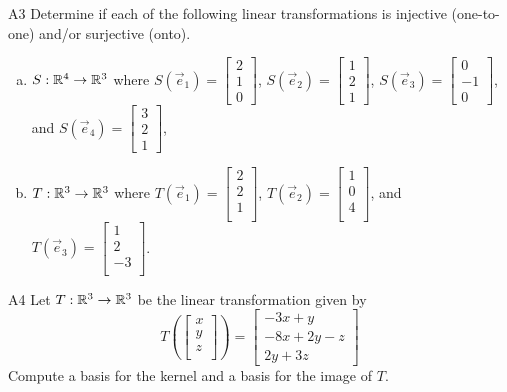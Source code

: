 \documentclass{sbgLAsemi}
\begin{document}
\begin{problem}{A3}
Determine if each of the following linear transformations is injective (one-to-one) and/or surjective (onto).
\begin{enumerate}[(a)]
\item
  \(S: \mathbb{R}^4 \rightarrow \mathbb{R}^3\) where
  \(S(\vec e_1)=\begin{bmatrix}
    2  \\
    1 \\
    0
  \end{bmatrix}\),
  \(S(\vec e_2)=\begin{bmatrix}
    1  \\
    2\\
    1
  \end{bmatrix}\),
  \(S(\vec e_3)=\begin{bmatrix}
    0  \\
    -1 \\
    0
  \end{bmatrix}\), and
  \(S(\vec e_4)=\begin{bmatrix}
    3 \\
    2\\
    1
  \end{bmatrix}\),
\item
  \(T: \mathbb{R}^3 \rightarrow \mathbb{R}^3\) where
  \(T(\vec e_1)=\begin{bmatrix}
    2  \\
    2 \\
    1\\
  \end{bmatrix}\),
  \(T(\vec e_2)=\begin{bmatrix}
     1 \\
     0 \\
     4 \\
  \end{bmatrix}\), and
  \(T(\vec e_3)=\begin{bmatrix}
     1 \\
     2 \\
     -3 \\
  \end{bmatrix}\).
\end{enumerate}
\end{problem}

\begin{problem}{A4}
Let $T: \mathbb{R}^3\rightarrow \mathbb{R}^3$ be the linear transformation given by $$T\left(\begin{bmatrix} x \\ y \\ z \\  \end{bmatrix} \right) = \begin{bmatrix} -3x+y \\ -8x+2y-z \\ 2y+3z \end{bmatrix}$$
Compute a basis for the kernel and a basis for the image of $T$.
\end{problem}
\end{document}
